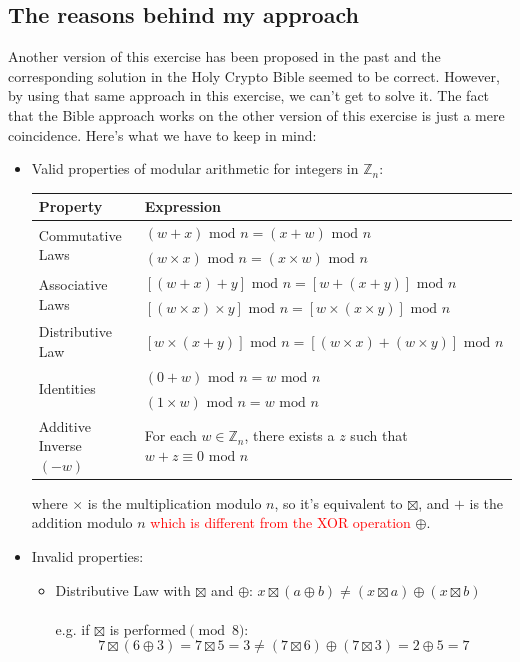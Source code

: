 \documentclass[11pt, a4paper]{article}
\newcommand{\mymod}{
    \text{ mod }
}
\begin{document}
\subsection{The reasons behind my approach}
Another version of this exercise has been proposed in the past and the corresponding solution in the Holy Crypto Bible seemed to be correct. However, by using that same approach in this exercise, we can't get to solve it. The fact that the Bible approach works on the other version of this exercise is just a mere coincidence. Here's what we have to keep in mind:
\begin{itemize}
    \item Valid properties of modular arithmetic for integers in $\mathbb{Z}_n$:
    \begin{center}
        \bgroup
        \def\arraystretch{1.5}
        \begin{tabular}{|l|l|}
            \hline
            \textbf{Property} & \textbf{Expression}\\
            \hline
            \multirow{2}{*}{Commutative Laws} & $(w+x)\mymod n=(x+w)\mymod n$\\
            & $(w\times x)\mymod n = (x\times w)\mymod n$\\
            \hline
            \multirow{2}{*}{Associative Laws} & $[(w+x)+y]\mymod n=[w+(x+y)]\mymod n$\\
            & $[(w\times x)\times y]\mymod n=[w\times (x\times y)]\mymod n$\\
            \hline
            Distributive Law & $[w\times(x+y)]\mymod n=[(w\times x)+(w\times y)]\mymod n$\\
            \hline
            \multirow{2}{*}{Identities} & $(0+w)\mymod n=w \mymod n$\\
            & $(1\times w)\mymod n=w\mymod n$\\
            \hline
            Additive Inverse $(-w)$ & For each $w\in\mathbb{Z}_n$, there exists a $z$ such that $w+z\equiv 0\mymod n$\\
            \hline
        \end{tabular}
        \egroup
    \end{center}
    where $\times$ is the multiplication modulo $n$, so it's equivalent to $\boxtimes$, and $+$ is the addition modulo $n$ \textcolor{red}{which is different from the XOR operation} $\oplus$.
    \item Invalid properties:
    \begin{itemize}
        \item Distributive Law with $\boxtimes$ and $\oplus$: $x\boxtimes(a\oplus b)\not=(x\boxtimes a)\oplus(x\boxtimes b)$\\\\
        e.g. if $\boxtimes$ is performed$\pmod8$:
        $$7\boxtimes(6\oplus3)=7\boxtimes5=3\not=(7\boxtimes6)\oplus(7\boxtimes3)=2\oplus5=7$$
    \end{itemize}
\end{itemize}
\newpage
\end{document}
